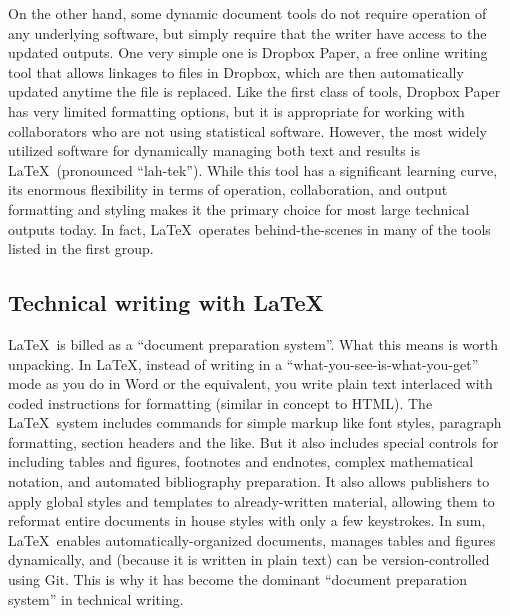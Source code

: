 On the other hand, some dynamic document tools do not require
operation of any underlying software, but simply require
that the writer have access to the updated outputs.
One very simple one is Dropbox Paper, a free online writing tool
that allows linkages to files in Dropbox,
which are then automatically updated anytime the file is replaced.
Like the first class of tools, Dropbox Paper has very limited formatting options,
but it is appropriate for working with collaborators who are not using statistical software.
However, the most widely utilized software
for dynamically managing both text and results is \LaTeX\ (pronounced ``lah-tek'').
  \index{\LaTeX}
While this tool has a significant learning curve,
its enormous flexibility in terms of operation, collaboration,
and output formatting and styling
makes it the primary choice for most large technical outputs today.
In fact, \LaTeX\ operates behind-the-scenes in many of the tools listed in the first group.

\subsection{Technical writing with \LaTeX}

\LaTeX\ is billed as a ``document preparation system''.
What this means is worth unpacking.
In {\LaTeX}, instead of writing in a ``what-you-see-is-what-you-get'' mode
as you do in Word or the equivalent,
you write plain text interlaced with coded instructions for formatting
(similar in concept to HTML).
The \LaTeX\ system includes commands for simple markup
like font styles, paragraph formatting, section headers and the like.
But it also includes special controls for including tables and figures,
footnotes and endnotes, complex mathematical notation, and automated bibliography preparation.
It also allows publishers to apply global styles and templates
to already-written material, allowing them to reformat entire documents in house styles
with only a few keystrokes.
In sum, \LaTeX\ enables automatically-organized documents,
manages tables and figures dynamically,
and (because it is written in plain text) can be version-controlled using Git.
This is why it has become the dominant ``document preparation system'' in technical writing.

